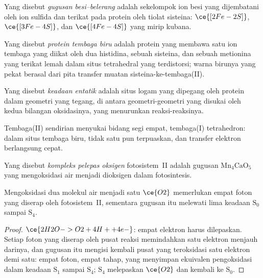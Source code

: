 \begin{definition}\label{def:b3:bioinorganic:fes}
Yang disebut \emph{gugusan besi--belerang} adalah sekelompok ion
besi yang dijembatani oleh ion sulfida dan terikat pada protein oleh tiolat sisteina:
$\ce{[2Fe-2S]}$, $\ce{[3Fe-4S]}$, dan $\ce{[4Fe-4S]}$ yang mirip kubana.
\end{definition}

\begin{definition}\label{def:b3:bioinorganic:blue-copper}
Yang disebut \emph{protein tembaga biru} adalah protein yang membawa satu
ion tembaga yang diikat oleh dua histidina, sebuah sisteina, dan sebuah metionina yang terikat lemah dalam
situs tetrahedral yang terdistorsi; warna birunya yang pekat berasal dari pita transfer muatan
sisteina-ke-tembaga(II).
\end{definition}

\begin{definition}\label{def:b3:bioinorganic:entatic}
Yang disebut \emph{keadaan entatik} adalah situs logam yang dipegang oleh
protein dalam geometri yang tegang, di antara geometri-geometri yang disukai oleh kedua
bilangan oksidasinya, yang menurunkan  reaksi-reaksinya.
\end{definition}

Tembaga(II) sendirian menyukai bidang segi empat, tembaga(I) tetrahedron: dalam situs
tembaga biru, tidak satu pun terpuaskan, dan transfer elektron berlangsung cepat.

\begin{definition}\label{def:b3:bioinorganic:oec}
Yang disebut \emph{kompleks pelepas oksigen}
fotosistem~II adalah gugusan $\mathrm{Mn_4CaO_5}$ yang mengoksidasi air menjadi dioksigen dalam
fotosintesis.
\end{definition}

\begin{proposition}\label{prop:b3:bioinorganic:kok}
Mengoksidasi dua molekul air menjadi satu $\ce{O2}$ memerlukan empat foton yang diserap oleh
fotosistem~II, sementara gugusan itu melewati lima keadaan $\mathrm S_0$ sampai $\mathrm S_4$.
\end{proposition}

\begin{proof}
$\ce{2H2O -> O2 + 4H+ + 4e-}$: empat elektron harus dilepaskan. Setiap foton yang diserap oleh
pusat reaksi memindahkan satu elektron menjauh darinya, dan gugusan itu mengisi kembali
pusat yang teroksidasi satu elektron demi satu: empat foton, empat tahap, yang menyimpan
ekuivalen pengoksidasi dalam keadaan $\mathrm S_1$ sampai $\mathrm S_4$; $\mathrm S_4$ melepaskan $\ce{O2}$ dan kembali ke $\mathrm S_0$.
\end{proof}

